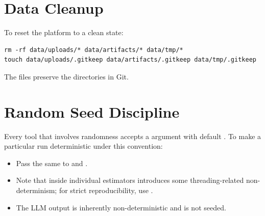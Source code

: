 \section{Data Cleanup}
\label{sec:cleanup}

To reset the platform to a clean state:

\begin{lstlisting}[style=alBash, numbers=none]
rm -rf data/uploads/* data/artifacts/* data/tmp/*
touch data/uploads/.gitkeep data/artifacts/.gitkeep data/tmp/.gitkeep
\end{lstlisting}

The  files preserve the directories in Git.

\section{Random Seed Discipline}
\label{sec:seed}

Every tool that involves randomness accepts a
 argument with default . To make a
particular run deterministic under this convention:

\begin{itemize}[leftmargin=1.4em]
  \item Pass the same  to
         and
        .
  \item Note that  inside individual estimators
        introduces some threading-related non-determinism; for
        strict reproducibility, use .
  \item The LLM output is inherently non-deterministic and is not
        seeded.
\end{itemize}
